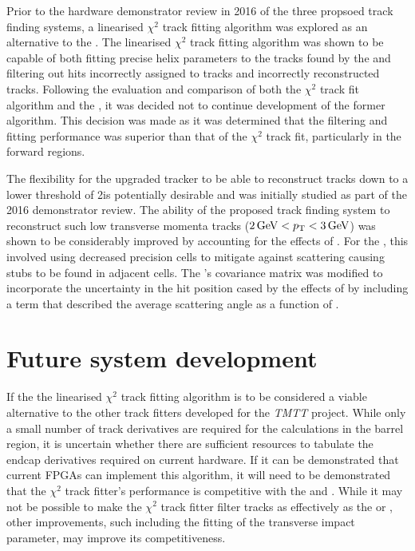 Prior to the hardware demonstrator review in 2016 of the three propsoed track finding systems, a linearised $\chi^{2}$ track fitting algorithm was explored as an alternative to the \KF.
The linearised $\chi^{2}$ track fitting algorithm was shown to be capable of both fitting precise helix parameters to the tracks found by the \HT and filtering out hits incorrectly assigned to tracks and incorrectly reconstructed tracks.
Following the evaluation and comparison of both the $\chi^{2}$ track fit algorithm and the \KF, it was decided not to continue development of the former algorithm.
This decision was made as it was determined that the \KF filtering and fitting performance was superior than that of the $\chi^{2}$ track fit, particularly in the forward regions.

The flexibility for the upgraded tracker to be able to reconstruct tracks down to a lower \pT threshold of 2\GeV is potentially desirable and was initially studied as part of the 2016 demonstrator review.
The ability of the proposed track finding system to reconstruct such low transverse momenta tracks ($2\,\text{Ge\hspace{-.08em}V} < p_{\mathrm{T}} < 3\,\text{Ge\hspace{-.08em}V}$) was shown to be considerably improved by accounting for the effects of \MS. 
For the \HT, this involved using decreased precision \HT cells to mitigate against scattering causing stubs to be found in adjacent cells.
The \KF's covariance matrix was modified to incorporate the uncertainty in the hit position cased by the effects of \MS by including a term that described the average scattering angle as a function of \pT.

\section{Future system development}
If the the linearised $\chi^{2}$ track fitting algorithm is to be considered a viable alternative to the other track fitters developed for the \emph{TMTT} project.
While only a small number of track derivatives are required for the calculations in the barrel region, it is uncertain whether there are sufficient resources to tabulate the endcap derivatives required on current hardware.
If it can be demonstrated that current FPGAs can implement this algorithm, it will need to be demonstrated that the $\chi^{2}$ track fitter's performance is competitive with the \KF and \LR.
While it may not be possible to make the $\chi^{2}$ track fitter filter tracks as effectively as the \KF or \LR , other improvements, such including the fitting of the transverse impact parameter, may improve its competitiveness.

